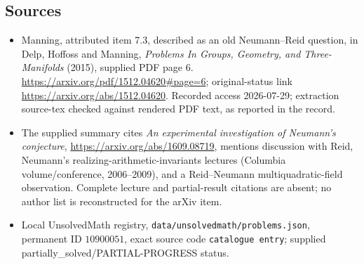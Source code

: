 \documentclass[11pt]{article}
\begin{document}
\subsection{Sources}
\begin{itemize}
\item Manning, attributed item 7.3, described as an old Neumann--Reid question, in Delp, Hoffoss and Manning, \emph{Problems In Groups, Geometry, and Three-Manifolds} (2015), supplied PDF page 6. \url{https://arxiv.org/pdf/1512.04620#page=6}; original-status link \url{https://arxiv.org/abs/1512.04620}. Recorded access 2026-07-29; extraction source-tex checked against rendered PDF text, as reported in the record.
\item The supplied summary cites \emph{An experimental investigation of Neumann's conjecture}, \url{https://arxiv.org/abs/1609.08719}, mentions discussion with Reid, Neumann's realizing-arithmetic-invariants lectures (Columbia volume/conference, 2006--2009), and a Reid--Neumann multiquadratic-field observation. Complete lecture and partial-result citations are absent; no author list is reconstructed for the arXiv item.
\item Local UnsolvedMath registry, \texttt{data/unsolvedmath/problems.json}, permanent ID \(10900051\), exact source code \texttt{catalogue entry}; supplied partially\_solved/PARTIAL-PROGRESS status.
\end{itemize}
\end{document}
